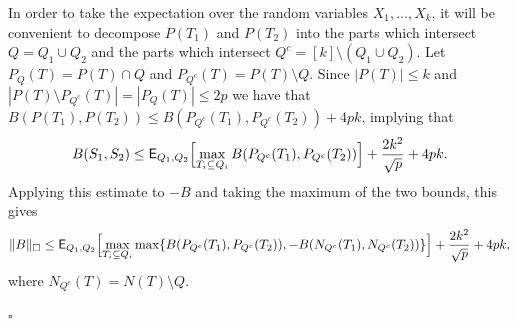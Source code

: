 \documentclass[12pt]{article}
\numberwithin{equation}{section}
\newenvironment{proof}{\medskip\noindent{\bf Proof.
}}{\hfill$\square$\medskip}
\def\E{{\sf E}}
\begin{document}
\begin{proof}
In order to take the expectation over the random variables
$X_1,\dots,X_k$, it will be convenient to decompose $P(T_1)$ and
$P(T_2)$ into the parts which intersect $Q=Q_1\cup Q_2$ and the parts
which intersect  $Q^c=[k]\setminus (Q_1\cup Q_2)$. Let
$P_Q(T)=P(T)\cap Q$ and $P_{Q^c}(T)=P(T)\setminus Q$. Since
$|P(T)|\leq k$ and $|P(T)\setminus P_{Q^c}(T)|=|P_Q(T)|\leq 2p$ we
have that $B(P(T_1),P(T_2))\leq B(P_{Q^c}(T_1),P_{Q^c}(T_2))+4pk$,
implying that
\[
B(S_1,S_2) \leq \E_{Q_1,Q_2}\Bigl[ \max_{T_i\subseteq Q_i}
B(P_{Q^c}(T_1),P_{Q^c}(T_2))\Bigr] +\frac {2k^2}{\sqrt p} + 4pk.
\]
Applying this estimate to $-B$ and taking the maximum of the two
bounds, this gives
\begin{equation}
\label{B+bound} \|B\|_\square \leq \E_{Q_1,Q_2}\Bigl[
\max_{T_i\subseteq Q_i} \max\{B(P_{Q^c}(T_1),P_{Q^c}(T_2)),
-B(N_{Q^c}(T_1),N_{Q^c}(T_2))\} \Bigr] +\frac {2k^2}{\sqrt p} + 4pk,
\end{equation}
where $N_{Q^c}(T)=N(T)\setminus Q$.


\end{proof}
\end{document}
